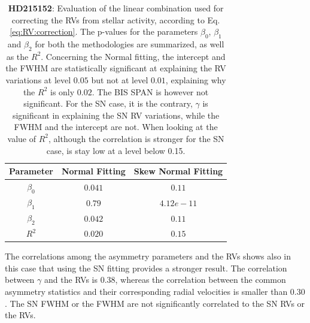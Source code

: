 \documentclass[11pt, oneside]{article}
\begin{document}
\begin{table}[!t]
\begin{tabular}{|c|c|c|}
\hline
Parameter          & Normal Fitting         &   Skew Normal Fitting \\
\hline
$\beta_{0}$            &    $0.041$    & $0.11$ \\
\hline
$\beta_{1}$            &    $0.79$    & $4.12e-11$ \\
\hline
$\beta_{2}$            &     $0.042$   &  $0.11$ \\
\hline
$R^{2}$      &     $0.020$    &  $0.15$   \\
\hline
\end{tabular}
\caption{\textbf{HD215152}: Evaluation of the linear combination used for correcting the RVs from stellar activity, according to Eq. \ref{eq:RV:correction}. The p-values for the parameters $\beta_{0}$, $\beta_{1}$ and $\beta_{2}$ for both the methodologies are summarized, as well as the $R^2$. Concerning the Normal fitting, the intercept and the FWHM are statistically significant at explaining the RV variations at level $0.05$ but not at level $0.01$, explaining why the $R^{2}$ is only $0.02$. The BIS SPAN is however not significant. For the SN case, it is the contrary, $\gamma$ is significant in explaining the SN RV variations, while the FWHM and the intercept are not. When looking at the value of 
$R^2$, although the correlation is stronger for the SN case, is stay low at a level below 0.15.}
\label{table:HD215152:test}
\end{table}

The correlations among the asymmetry parameters and the RVs shows also in this case that using the SN fitting provides a stronger result. The correlation between $\gamma$ and the RVs is $0.38$, whereas the correlation between the common asymmetry statistics and their corresponding radial velocities is smaller than $0.30$. The SN FWHM or the FWHM are not significantly correlated to the SN RVs or the RVs.
\fi

\end{document}
